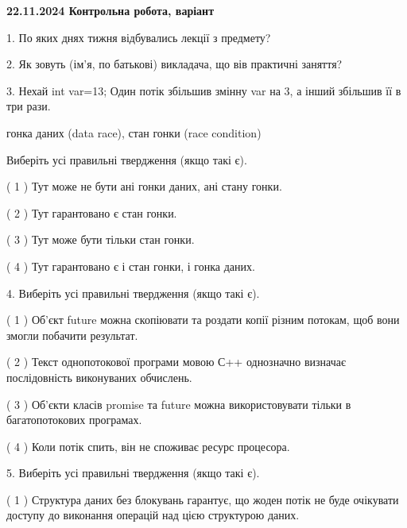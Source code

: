 \documentclass[12pt, ukrainian]{article}
\begin{document}
\vspace{4mm}
\newpage
\begin {large}

\textbf{22.11.2024 Контрольна робота, варіант  }\par


{
1. По яких днях тижня відбувались лекції з предмету?



\vspace{5mm}
2. Як зовуть (ім'я, по батькові) викладача, що вів практичні заняття?



\vspace{5mm}
3. Нехай int var=13; Один потік збільшив змінну var на 3, а інший збільшив її в три рази.

гонка даних (data race), стан гонки (race condition)

Виберіть усі правильні твердження (якщо такі є).\par
\vspace{2mm}
( 1 ) Тут може не бути ані гонки даних, ані стану гонки.%

( 2 ) Тут гарантовано є стан гонки.%

( 3 ) Тут може бути тільки стан гонки.%

( 4 ) Тут гарантовано є і стан гонки, і гонка даних.%


\vspace{5mm}
4. Виберіть усі правильні твердження (якщо такі є).\par
\vspace{2mm}

( 1 ) Об’єкт future можна скопіювати та роздати копії різним потокам, щоб вони змогли побачити результат.%

( 2 ) Текст однопотокової програми мовою С++ однозначно визначає послідовність виконуваних обчислень.%

( 3 ) Об’єкти класів promise та future можна використовувати тільки в багатопотокових програмах.%

( 4 ) Коли потік спить, він не споживає ресурс процесора.%


\vspace{5mm}
5. Виберіть усі правильні твердження (якщо такі є).\par
\vspace{2mm}

( 1 ) Структура даних без блокувань гарантує, що жоден потік не буде очікувати доступу до виконання операцій над цією структурою даних.%

}
\end{large}
\end{document}
